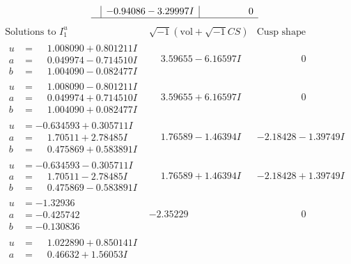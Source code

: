 \documentclass[1p]{elsarticle_modified}
\theoremstyle{definition}
\newcommand{\I}{\sqrt{-1}}
\begin{document}
$$\begin{array}{c|c|c}
 & -0.94086 - 3.29997 I & \phantom{-0.000000 } 0\\
 \hline 
 \end{array}$$\newpage$$\begin{array}{c|c|c}  
\text{Solutions to }I^u_{1}& \I (\text{vol} + \sqrt{-1}CS) & \text{Cusp shape}\\
 \hline 
\begin{aligned}
u &= \phantom{-}1.008090 + 0.801211 I \\
a &= \phantom{-}0.049974 - 0.714510 I \\
b &= \phantom{-}1.004090 - 0.082477 I\end{aligned}
 & \phantom{-}3.59655 - 6.16597 I & \phantom{-0.000000 } 0 \\ \hline\begin{aligned}
u &= \phantom{-}1.008090 - 0.801211 I \\
a &= \phantom{-}0.049974 + 0.714510 I \\
b &= \phantom{-}1.004090 + 0.082477 I\end{aligned}
 & \phantom{-}3.59655 + 6.16597 I & \phantom{-0.000000 } 0 \\ \hline\begin{aligned}
u &= -0.634593 + 0.305711 I \\
a &= \phantom{-}1.70511 + 2.78485 I \\
b &= \phantom{-}0.475869 + 0.583891 I\end{aligned}
 & \phantom{-}1.76589 - 1.46394 I & -2.18428 - 1.39749 I \\ \hline\begin{aligned}
u &= -0.634593 - 0.305711 I \\
a &= \phantom{-}1.70511 - 2.78485 I \\
b &= \phantom{-}0.475869 - 0.583891 I\end{aligned}
 & \phantom{-}1.76589 + 1.46394 I & -2.18428 + 1.39749 I \\ \hline\begin{aligned}
u &= -1.32936\phantom{ +0.000000I} \\
a &= -0.425742\phantom{ +0.000000I} \\
b &= -0.130836\phantom{ +0.000000I}\end{aligned}
 & -2.35229\phantom{ +0.000000I} & \phantom{-0.000000 } 0 \\ \hline\begin{aligned}
u &= \phantom{-}1.022890 + 0.850141 I \\
a &= \phantom{-}0.46632 + 1.56053 I \\

\end{aligned}
\end{array}$$
\end{document}
